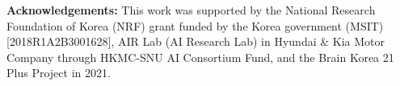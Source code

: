 \documentclass[final]{cvpr}
\begin{document}
\bigskip
\noindent\textbf{Acknowledgements:}
This work was supported by the National Research Foundation of Korea (NRF) grant funded by the Korea government (MSIT) [2018R1A2B3001628], AIR Lab (AI Research Lab) in Hyundai \& Kia Motor Company through HKMC-SNU AI Consortium Fund, and the Brain Korea 21 Plus Project in 2021.




{\small


}

\setcounter{section}{0}
\renewcommand\thesection{\Alph{section}}
\setcounter{table}{0}
\renewcommand{\thetable}{A\arabic{table}}
\setcounter{figure}{0}
\renewcommand{\thefigure}{A\arabic{figure}}

\clearpage

\renewcommand{\tabcolsep}{2pt}
\end{document}
